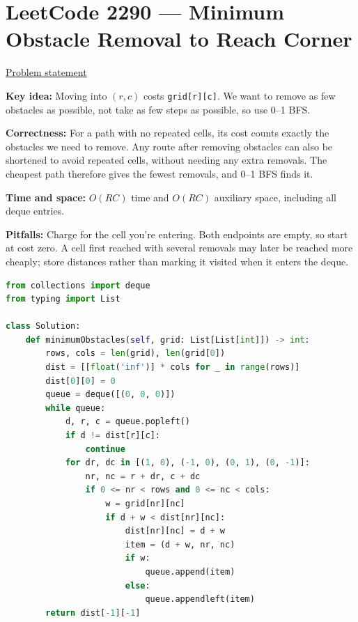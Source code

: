 \documentclass[11pt]{article}
\newcommand{\insight}[1]{\par\medskip\noindent\textbf{Key idea:} #1}
\newcommand{\correct}[1]{\par\textbf{Correctness:} #1}
\newcommand{\bounds}[1]{\par\textbf{Time and space:} #1}
\newcommand{\pitfalls}[1]{\par\textbf{Pitfalls:} #1}
\begin{document}
\section{LeetCode 2290 --- Minimum Obstacle Removal to Reach Corner}
\href{https://leetcode.com/problems/minimum-obstacle-removal-to-reach-corner/}{Problem statement}
\insight{Moving into $(r,c)$ costs \texttt{grid[r][c]}. We want to remove as few obstacles as possible, not take as few steps as possible, so use 0--1 BFS.}
\correct{For a path with no repeated cells, its cost counts exactly the obstacles we need to remove. Any route after removing obstacles can also be shortened to avoid repeated cells, without needing any extra removals. The cheapest path therefore gives the fewest removals, and 0--1 BFS finds it.}
\bounds{$O(RC)$ time and $O(RC)$ auxiliary space, including all deque entries.}
\pitfalls{Charge for the cell you're entering. Both endpoints are empty, so start at cost zero. A cell first reached with several removals may later be reached more cheaply; store distances rather than marking it visited when it enters the deque.}
\begin{lstlisting}[language=Python,caption={P06 --- Python 3},label={lst:p06-python}]
from collections import deque
from typing import List

class Solution:
    def minimumObstacles(self, grid: List[List[int]]) -> int:
        rows, cols = len(grid), len(grid[0])
        dist = [[float('inf')] * cols for _ in range(rows)]
        dist[0][0] = 0
        queue = deque([(0, 0, 0)])
        while queue:
            d, r, c = queue.popleft()
            if d != dist[r][c]:
                continue
            for dr, dc in [(1, 0), (-1, 0), (0, 1), (0, -1)]:
                nr, nc = r + dr, c + dc
                if 0 <= nr < rows and 0 <= nc < cols:
                    w = grid[nr][nc]
                    if d + w < dist[nr][nc]:
                        dist[nr][nc] = d + w
                        item = (d + w, nr, nc)
                        if w:
                            queue.append(item)
                        else:
                            queue.appendleft(item)
        return dist[-1][-1]
\end{lstlisting}
\end{document}
